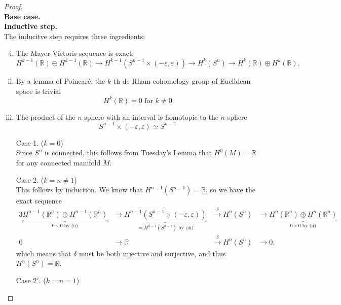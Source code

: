 \documentclass{article}
\begin{document}
\begin{proof} \text{} \\
  \textbf{Base case.}\\
  \textbf{Inductive step.}\\
    The inducitve step requires three ingredients:
    \begin{enumerate}[(i)]
      \item The Mayer-Vietoris sequence is exact: \[
        H^{k-1}(\mathbb{R}) \oplus H^{k-1}(\mathbb{R})
        \rightarrow H^{k-1}(S^{n-1} \times (-\varepsilon, \varepsilon))
        \rightarrow H^k(S^n)
        \rightarrow H^k(\mathbb{R}) \oplus H^k(\mathbb{R}).
      \]
      \item By a lemma of Poincar\'e, the $k$-th de Rham cohomology group of
      Euclidean space is trivial \[
        H^k(\mathbb{R}) = 0 \text{ for } k \neq 0
      \]
      \item The product of the $n$-sphere with an interval is homotopic to the $n$-sphere \[
        S^{n-1} \times (-\varepsilon, \varepsilon) \simeq S^{n-1}
      \]
    \end{enumerate}
    \begin{enumerate}
      \item[Case 1.] ($k = 0$)\\
        Since $S^n$ is connected, this follows from Tuesday's Lemma that
        $H^0(M) = \mathbb{R}$ for any connected manifold $M$.
      \item[Case 2.] ($k = n \neq 1$)\\
        This follows by induction. We know that $H^{n-1}(S^{n-1}) = \mathbb{R}$,
        so we have the exact sequence \begin{alignat*}{3}
          \underbrace{H^{n-1}(\mathbb{R}^n) \oplus H^{n-1}(\mathbb{R}^n)}_{0 \times 0 \text{ by (ii)}}
          &\rightarrow \underbrace{H^{n-1}(S^{n-1} \times (-\varepsilon, \varepsilon))}_{= H^{n-1}(S^{n-1}) \text{ by (iii)}}
          &\xrightarrow{\delta} H^n(S^n)
          &\rightarrow \underbrace{H^n(\mathbb{R}^n) \oplus H^n(\mathbb{R}^n)}_{0 \times 0 \text{ by (ii)}}
          \\
          0 &\rightarrow \mathbb{R} &\xrightarrow{\delta} H^n(S^n) &\rightarrow 0.
        \end{alignat*} which means that $\delta$ must be both injective and
        surjective, and thus $H^n(S^n) = \mathbb{R}$.
      \item[Case 2$'$.] ($k = n = 1$)\\

\end{enumerate}
\end{proof}
\end{document}
